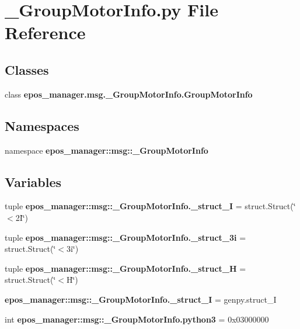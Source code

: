 \section{\-\_\-\-Group\-Motor\-Info.\-py \-File \-Reference}
\label{__GroupMotorInfo_8py}
\subsection*{\-Classes}
\begin{DoxyCompactItemize}
\item 
class {\bf epos\-\_\-manager.\-msg.\-\_\-\-Group\-Motor\-Info.\-Group\-Motor\-Info}
\end{DoxyCompactItemize}
\subsection*{\-Namespaces}
\begin{DoxyCompactItemize}
\item 
namespace {\bf epos\-\_\-manager\-::msg\-::\-\_\-\-Group\-Motor\-Info}
\end{DoxyCompactItemize}
\subsection*{\-Variables}
\begin{DoxyCompactItemize}
\item 
tuple {\bf epos\-\_\-manager\-::msg\-::\-\_\-\-Group\-Motor\-Info.\-\_\-struct\-\_\-I} = struct.\-Struct(\char`\"{}$<$2\-I\char`\"{})
\item 
tuple {\bf epos\-\_\-manager\-::msg\-::\-\_\-\-Group\-Motor\-Info.\-\_\-struct\-\_\-3i} = struct.\-Struct(\char`\"{}$<$3i\char`\"{})
\item 
tuple {\bf epos\-\_\-manager\-::msg\-::\-\_\-\-Group\-Motor\-Info.\-\_\-struct\-\_\-\-H} = struct.\-Struct(\char`\"{}$<$\-H\char`\"{})
\item 
{\bf epos\-\_\-manager\-::msg\-::\-\_\-\-Group\-Motor\-Info.\-\_\-struct\-\_\-\-I} = genpy.\-struct\-\_\-\-I
\item 
int {\bf epos\-\_\-manager\-::msg\-::\-\_\-\-Group\-Motor\-Info.\-python3} = 0x03000000
\end{DoxyCompactItemize}
